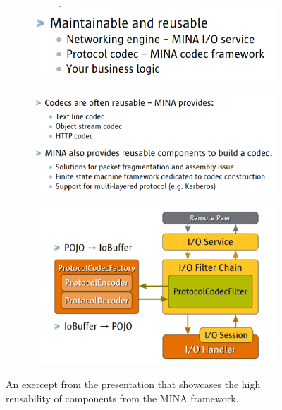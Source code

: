 \begin{figure}[H]
    \centering
    \begin{subfigure}[b]{0.7\textwidth}
         \centering
         \includegraphics[width=\textwidth]{images/reusable1.png}
     \end{subfigure}

     \begin{subfigure}[b]{0.7\textwidth}
         \centering
         \includegraphics[width=\textwidth]{images/reusable.png}
     \end{subfigure}
     
    \begin{subfigure}[b]{0.7\textwidth}
         \centering
         \includegraphics[width=\textwidth]{images/architecture_codec.png}
     \end{subfigure}
    
    \caption{An exercept from the presentation \cite{mina-talk2008} that showcases the high reusability  of components from the MINA framework.}
    \label{fig:reusability}
\end{figure}
\newpage
